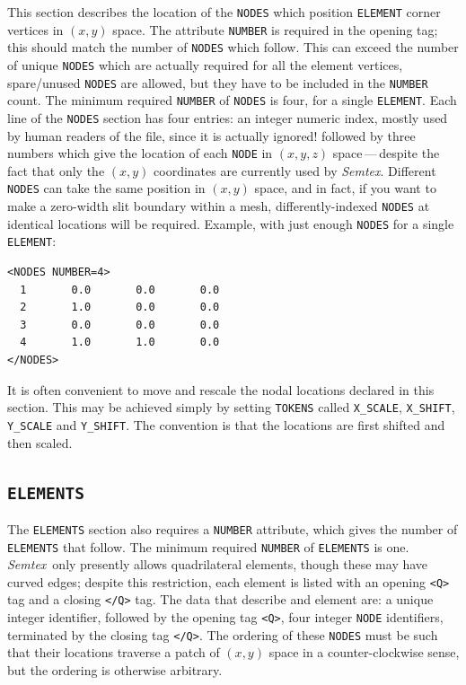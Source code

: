 \documentclass[11pt]{report}
\newcommand{\Semtex}{\emph{Semtex}} \newcommand{\Dog}{\emph{Dog}}
\begin{document}
This section describes the location of the \verb|NODES| which position
\verb|ELEMENT| corner vertices in $(x,y)$ space.  The attribute
\verb|NUMBER| is required in the opening tag; this should match the
number of \verb|NODES| which follow.  This can exceed the number of
unique \verb|NODES| which are actually required for all the element
vertices, \ie spare/unused \verb|NODES| are allowed, but they have to
be included in the \verb|NUMBER| count. The minimum required
\verb|NUMBER| of \verb|NODES| is four, \ie for a single
\verb|ELEMENT|.  Each line of the \verb|NODES| section has four
entries: an integer numeric index, mostly used by human readers of the
file, since it is actually ignored!  followed by three numbers which
give the location of each \verb|NODE| in $(x,y,z)$ space\,---\,despite
the fact that only the $(x,y)$ coordinates are currently used by
\Semtex.  Different \verb|NODES| can take the same position in $(x,y)$
space, and in fact, if you want to make a zero-width slit boundary
within a mesh, differently-indexed \verb|NODES| at identical locations
will be required.  Example, with just enough \verb|NODES| for a single
\verb|ELEMENT|:
%
{\small
\begin{verbatim}
<NODES NUMBER=4>
  1       0.0       0.0       0.0
  2       1.0       0.0       0.0
  3       0.0       0.0       0.0
  4       1.0       1.0       0.0
</NODES>
\end{verbatim}
}
%
It is often convenient to move and rescale the nodal locations
declared in this section. This may be achieved simply by setting
\verb|TOKENS| called \verb|X_SCALE|, \verb|X_SHIFT|, \verb|Y_SCALE|
and \verb|Y_SHIFT|.  The convention is that the locations are first
shifted and then scaled.

\subsection{\texttt{ELEMENTS}}
\label{sec.elements}

The \verb|ELEMENTS| section also requires a \verb|NUMBER| attribute,
which gives the number of \verb|ELEMENTS| that follow.  The minimum
required \verb|NUMBER| of \verb|ELEMENTS| is one.  \Semtex\ only
presently allows quadrilateral elements, though these may have curved
edges; despite this restriction, each element is listed with an
opening \verb|<Q>| tag and a closing \verb|</Q>| tag.  The data that
describe and element are: a unique integer identifier, followed by the
opening tag \verb|<Q>|, four integer \verb|NODE| identifiers,
terminated by the closing tag \verb|</Q>|.  The ordering of these
\verb|NODES| must be such that their locations traverse a patch of
$(x,y)$ space in a counter-clockwise sense, but the ordering is
otherwise arbitrary.
\end{document}
